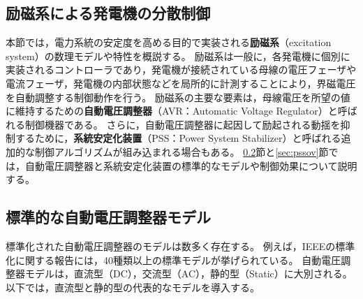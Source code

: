 \documentclass[tombow,dvipdfmx]{corona-a5-1.1}
\begin{document}
\subsection{励磁系による発電機の分散制御}

本節では，電力系統の安定度を高める目的で実装される\textbf{励磁系}（excitation system）の数理モデルや特性を概説する。
励磁系は一般に，各発電機に個別に実装されるコントローラであり，発電機が接続されている母線の電圧フェーザや電流フェーザ，発電機の内部状態などを局所的に計測することにより，界磁電圧を自動調整する制御動作を行う。
励磁系の主要な要素は，母線電圧を所望の値に維持するための\textbf{自動電圧調整器}（AVR：Automatic Voltage Regulator）と呼ばれる制御機器である。
さらに，自動電圧調整器に起因して励起される動揺を抑制するために，\textbf{系統安定化装置}（PSS：Power System Stabilizer）と呼ばれる追加的な制御アルゴリズムが組み込まれる場合もある。
\ref{sec:avrov}節と\ref{sec:pssov}節では，自動電圧調整器と系統安定化装置の標準的なモデルや制御効果について説明する。


%
%
%




\subsection{標準的な自動電圧調整器モデル}\label{sec:avrov}

標準化された自動電圧調整器のモデルは数多く存在する。
例えば，IEEEの標準化に関する報告\cite{ieee2016ieee}には，40種類以上の標準モデルが挙げられている。
自動電圧調整器モデルは，直流型（DC），交流型（AC），静的型（Static）に大別される。
以下では，直流型と静的型の代表的なモデルを導入する。
\end{document}
